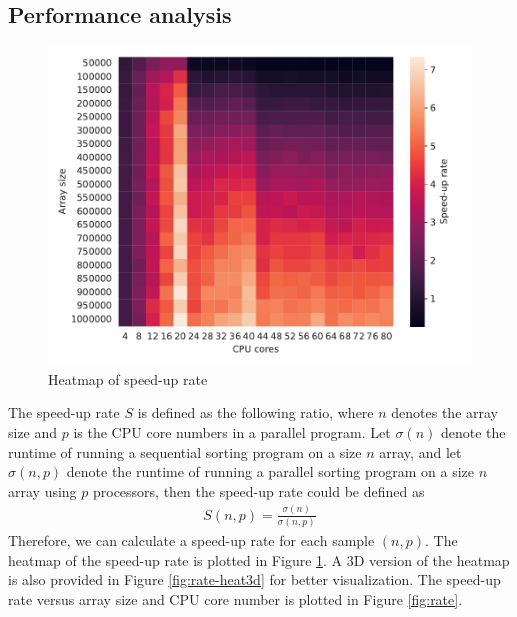 \documentclass[twoside,12pt]{article}
\theoremstyle{definition}
\theoremstyle{remark}
\begin{document}
\subsection{Performance analysis}
\begin{figure}[t!]
    \centering
    \includegraphics[width=\textwidth]{../analysis/rate_heatmap.pdf}
    \caption{Heatmap of speed-up rate}
    \label{fig:rate-heat}
\end{figure}
The speed-up rate $S$ is defined as the following ratio, where $n$ denotes the array size
and $p$ is the CPU core numbers in a parallel program.
Let $\sigma(n)$ denote the runtime of running a sequential sorting program on a size $n$ array,
and let $\sigma(n, p)$ denote the runtime of running a parallel sorting program on 
a size $n$ array using $p$ processors, then the speed-up rate could be defined as
\begin{align}
    S(n, p) = \frac{\sigma(n)}{\sigma(n, p)}
\end{align}
Therefore, we can calculate a speed-up rate for each sample $(n, p)$.
The heatmap of the speed-up rate is plotted in Figure \ref{fig:rate-heat}.
A 3D version of the heatmap is also provided in Figure \ref{fig:rate-heat3d} for better visualization.
The speed-up rate versus array size and CPU core number is plotted in Figure \ref{fig:rate}.
\end{document}
